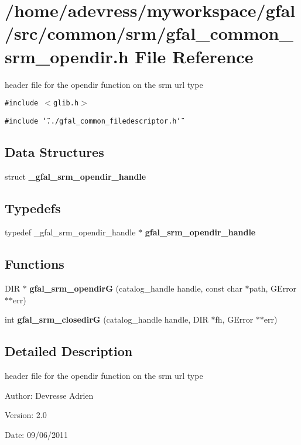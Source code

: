 \section{/home/adevress/myworkspace/gfal/src/common/srm/gfal\_\-common\_\-srm\_\-opendir.h File Reference}
\label{gfal__common__srm__opendir_8h}
header file for the opendir function on the srm url type 

{\tt \#include $<$glib.h$>$}\par
{\tt \#include \char`\"{}../gfal\_\-common\_\-filedescriptor.h\char`\"{}}\par
\subsection*{Data Structures}
\begin{CompactItemize}
\item 
struct \textbf{\_\-gfal\_\-srm\_\-opendir\_\-handle}
\end{CompactItemize}
\subsection*{Typedefs}
\begin{CompactItemize}
\item 
typedef \_\-gfal\_\-srm\_\-opendir\_\-handle $\ast$ \textbf{gfal\_\-srm\_\-opendir\_\-handle}\label{gfal__common__srm__opendir_8h_824f5b93bbf97b9fed247ce0d6603a2c}

\end{CompactItemize}
\subsection*{Functions}
\begin{CompactItemize}
\item 
DIR $\ast$ \textbf{gfal\_\-srm\_\-opendir\-G} (catalog\_\-handle handle, const char $\ast$path, GError $\ast$$\ast$err)\label{gfal__common__srm__opendir_8h_eb260930171b394886ba9846eb9523af}

\item 
int \textbf{gfal\_\-srm\_\-closedir\-G} (catalog\_\-handle handle, DIR $\ast$fh, GError $\ast$$\ast$err)\label{gfal__common__srm__opendir_8h_b13933375563a6c4cc44eb6d206c6fd9}

\end{CompactItemize}


\subsection{Detailed Description}
header file for the opendir function on the srm url type 

\begin{Desc}
\item[Author:]Devresse Adrien \end{Desc}
\begin{Desc}
\item[Version:]2.0 \end{Desc}
\begin{Desc}
\item[Date:]09/06/2011 \end{Desc}
